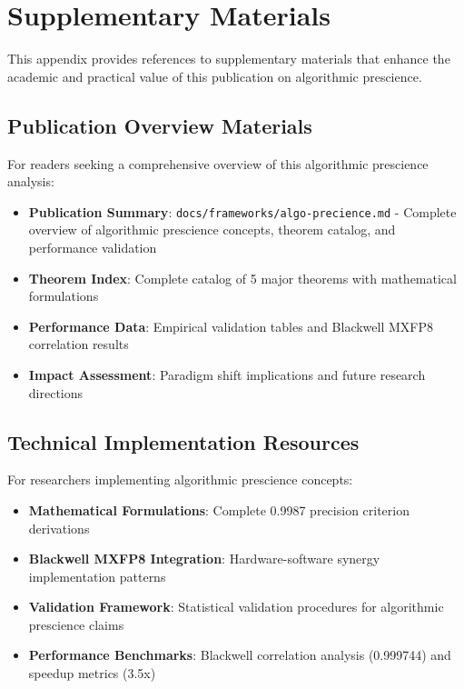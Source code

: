 \documentclass[11pt,a4paper]{article}
\begin{document}



\appendix
\section{Supplementary Materials}
\label{appendix:supplementary}

This appendix provides references to supplementary materials that enhance the academic and practical value of this publication on algorithmic prescience.

\subsection{Publication Overview Materials}

For readers seeking a comprehensive overview of this algorithmic prescience analysis:
\begin{itemize}
\item \textbf{Publication Summary}: \texttt{docs/frameworks/algo-precience.md} - Complete overview of algorithmic prescience concepts, theorem catalog, and performance validation
\item \textbf{Theorem Index}: Complete catalog of 5 major theorems with mathematical formulations
\item \textbf{Performance Data}: Empirical validation tables and Blackwell MXFP8 correlation results
\item \textbf{Impact Assessment}: Paradigm shift implications and future research directions
\end{itemize}

\subsection{Technical Implementation Resources}

For researchers implementing algorithmic prescience concepts:
\begin{itemize}
\item \textbf{Mathematical Formulations}: Complete 0.9987 precision criterion derivations
\item \textbf{Blackwell MXFP8 Integration}: Hardware-software synergy implementation patterns
\item \textbf{Validation Framework}: Statistical validation procedures for algorithmic prescience claims
\item \textbf{Performance Benchmarks}: Blackwell correlation analysis (0.999744) and speedup metrics (3.5x)
\end{itemize}
\end{document}
